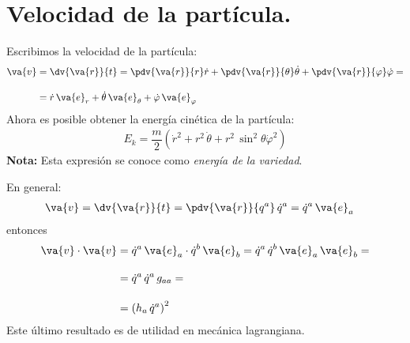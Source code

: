 \section{Velocidad de la partícula.}
Escribimos la velocidad de la partícula:
\begin{align*}
\va{v} &= \dv{\va{r}}{t} = \pdv{\va{r}}{r} \dot{r} + \pdv{\va{r}}{\theta} \dot{\theta} + \pdv{\va{r}}{\varphi} \dot{\varphi} = \\[1em]
&= \dot{r} \, \va{e}_{r} + \dot{\theta} \, \va{e}_{\theta} + \dot{\varphi} \, \va{e}_{\varphi}
\end{align*}
Ahora es posible obtener la energía cinética de la partícula:
\begin{align*}
E_{k} = \dfrac{m}{2} \left( \dot{r}^{2} + r^{2} \, \dot{\theta} + r^{2} \, \sin^{2} \theta \dot{\varphi}^{2} \right)
\end{align*}
\textbf{Nota: } Esta expresión se conoce como \emph{energía de la variedad}.
\par
En general:
\begin{align*}
\va{v} &= \dv{\va{r}}{t} = \pdv{\va{r}}{q^{a}} \, \dot{q}^{a} = \dot{q}^{a} \, \va{e}_{a}
\end{align*}
entonces
\begin{align*}
\va{v} \cdot \va{v} &= \dot{q}^{a} \, \va{e}_{a} \cdot \dot{q}^{b} \, \va{e}_{b} = \dot{q}^{a} \, \dot{q}^{b} \, \va{e}_{a} \, \va{e}_{b} = \\[1em]
&= \dot{q}^{a} \, \dot{q}^{a} \, g_{aa} = \\[1em]
&= \left( h_{a} \, \dot{q}^{a} \right)^{2}
\end{align*}
Este último resultado es de utilidad en mecánica lagrangiana.
